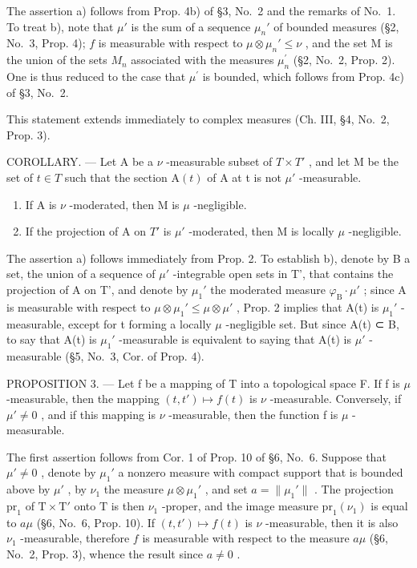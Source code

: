 The assertion a) follows from Prop. 4b) of §3, No.~2 and the remarks of No.~1. To treat b), note that \(\mu'\) is the sum of a sequence \(\mu_n'\) of bounded measures (§2, No.~3, Prop. 4); \(f\) is measurable with respect to \(\mu \otimes \mu_n' \leqslant \nu\) , and the set M is the union of the sets \(M_{n}\) associated with the measures \(\mu_{n}^{\prime}\) (§2, No.~2, Prop. 2). One is thus reduced to the case that \(\mu^{\prime}\) is bounded, which follows from Prop. 4c) of §3, No.~2.

This statement extends immediately to complex measures (Ch. III, §4, No.~2, Prop. 3).

COROLLARY. --- Let A be a \(\nu\) -measurable subset of \(T \times T'\) , and let M be the set of \(t \in T\) such that the section \(\mathrm{A}(t)\) of A at t is not \(\mu'\) -measurable.

\begin{enumerate}
\def\labelenumi{\alph{enumi})}
\item
  If A is \(\nu\) -moderated, then M is \(\mu\) -negligible.
\item
  If the projection of A on \(T'\) is \(\mu'\) -moderated, then M is locally \(\mu\) -negligible.
\end{enumerate}

The assertion a) follows immediately from Prop. 2. To establish b), denote by B a set, the union of a sequence of \(\mu'\) -integrable open sets in T', that contains the projection of A on T', and denote by \(\mu_1'\) the moderated measure \(\varphi_{\mathrm{B}} \cdot \mu'\) ; since A is measurable with respect to \(\mu \otimes \mu_1' \leqslant \mu \otimes \mu'\) , Prop. 2 implies that A(t) is \(\mu_1'\) -measurable, except for t forming a locally \(\mu\) -negligible set. But since A(t) ⊂ B, to say that A(t) is \(\mu_1'\) -measurable is equivalent to saying that A(t) is \(\mu'\) -measurable (§5, No.~3, Cor. of Prop. 4).

PROPOSITION 3. --- Let f be a mapping of T into a topological space F. If f is \(\mu\) -measurable, then the mapping \((t, t') \mapsto f(t)\) is \(\nu\) -measurable. Conversely, if \(\mu' \neq 0\) , and if this mapping is \(\nu\) -measurable, then the function f is \(\mu\) -measurable.

The first assertion follows from Cor. 1 of Prop. 10 of §6, No.~6. Suppose that \(\mu' \neq 0\) , denote by \(\mu_1'\) a nonzero measure with compact support that is bounded above by \(\mu'\) , by \(\nu_1\) the measure \(\mu \otimes \mu_1'\) , and set \(a = \| \mu_1'\|\) . The projection \(\mathrm{pr}_1\) of \(\mathrm{T} \times \mathrm{T}'\) onto \(\mathrm{T}\) is then \(\nu_1\) -proper, and the image measure \(\mathrm{pr}_1(\nu_1)\) is equal to \(a\mu\) (§6, No.~6, Prop. 10). If \((t, t') \mapsto f(t)\) is \(\nu\) -measurable, then it is also \(\nu_1\) -measurable, therefore \(f\) is measurable with respect to the measure \(a\mu\) (§6, No.~2, Prop. 3), whence the result since \(a \neq 0\) .

